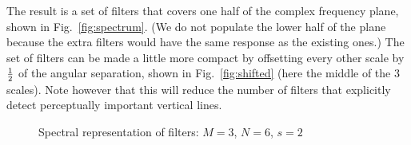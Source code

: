 \documentclass[12pt,a4]{article}
\begin{document}
The result is a set of filters that covers one half of the complex frequency plane, shown in Fig.~\ref{fig:spectrum}.  (We do not populate the lower half of the plane because the extra filters would have the same response as the existing ones.)  The set of filters can be made a little more compact by offsetting every other scale by $1\over 2$ of the angular separation, shown in Fig.~\ref{fig:shifted} (here the middle of the 3 scales).  Note however that this will reduce the number of filters that explicitly detect perceptually important vertical lines.
\begin{figure}[t]\centering
  \hspace{2em}
  \caption{Spectral representation of filters: $M=3$, $N=6$, $s=2$\label{fig:spectra}}
\end{figure}
\end{document}
